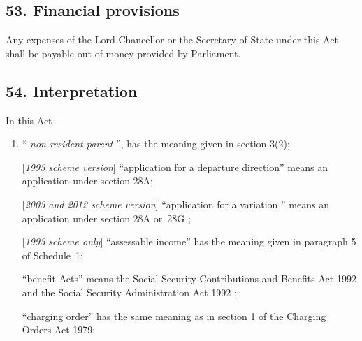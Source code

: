 \documentclass[12pt,a4paper]{article}
\begin{document}
\subsection{53. Financial provisions}

Any expenses of the Lord Chancellor or the Secretary of State under this Act shall be payable out of money provided by Parliament.


\subsection{54. Interpretation}

In this Act—
\begin{enumerate}\item[]
    “%
\emph{non-resident parent}%
”, has the meaning given in section 3(2);



[\emph{1993 scheme version}] “application for a departure direction” means an application under section 28A;

[\emph{2003 and 2012 scheme version}] “application for a 
variation%
” means an application under section 28A
or~28G%
;

[\emph{1993 scheme only}]     “assessable income” has the meaning given in paragraph 5 of Schedule~1;

    “benefit Acts” means the 
Social Security Contributions and Benefits Act 1992 and the Social Security Administration Act 1992%
;

“charging order” has the same meaning as in section 1 of the Charging Orders Act 1979;


\end{enumerate}
\end{document}
